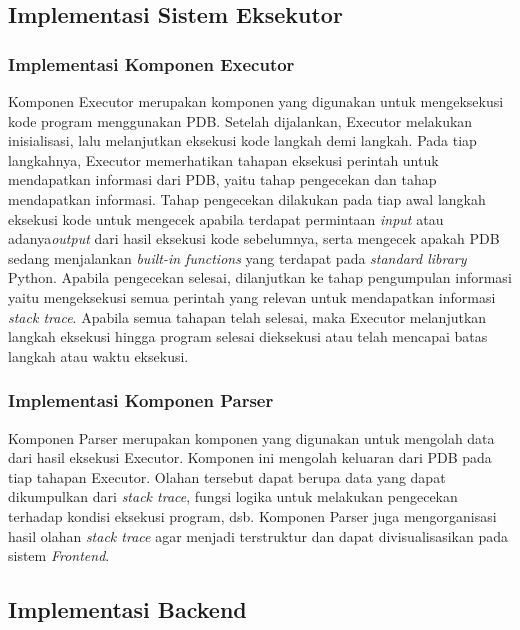 \subsection{Implementasi Sistem Eksekutor}
\subsubsection{Implementasi Komponen Executor}
Komponen Executor merupakan komponen yang digunakan untuk mengeksekusi kode program menggunakan PDB. Setelah dijalankan, Executor melakukan inisialisasi, lalu melanjutkan eksekusi kode langkah demi langkah. Pada tiap langkahnya, Executor memerhatikan tahapan eksekusi perintah untuk mendapatkan informasi dari PDB, yaitu tahap pengecekan dan tahap mendapatkan informasi. Tahap pengecekan dilakukan pada tiap awal langkah eksekusi kode untuk mengecek apabila terdapat permintaan \textit{input} atau adanya\textit{output} dari hasil eksekusi kode sebelumnya, serta mengecek apakah PDB sedang menjalankan \textit{built-in functions} yang terdapat pada \textit{standard library} Python. Apabila pengecekan selesai, dilanjutkan ke tahap pengumpulan informasi yaitu mengeksekusi semua perintah yang relevan untuk mendapatkan informasi \textit{stack trace}. Apabila semua tahapan telah selesai, maka Executor melanjutkan langkah eksekusi hingga program selesai dieksekusi atau telah mencapai batas langkah atau waktu eksekusi.

\subsubsection{Implementasi Komponen Parser}
Komponen Parser merupakan komponen yang digunakan untuk mengolah data dari hasil eksekusi Executor. Komponen ini mengolah keluaran dari PDB pada tiap tahapan Executor. Olahan tersebut dapat berupa data yang dapat dikumpulkan dari \textit{stack trace}, fungsi logika untuk melakukan pengecekan terhadap kondisi eksekusi program, dsb. Komponen Parser juga mengorganisasi hasil olahan \textit{stack trace} agar menjadi terstruktur dan dapat divisualisasikan pada sistem \textit{Frontend}.


\subsection{Implementasi Backend}
